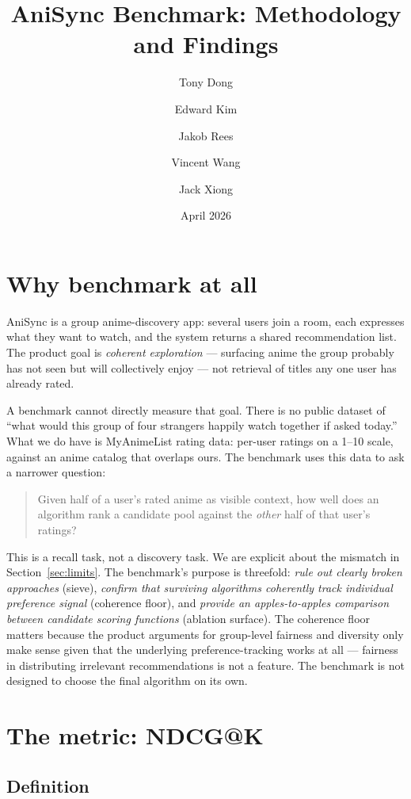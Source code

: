 \documentclass[11pt]{article}
\title{AniSync Benchmark: Methodology and Findings}
\author{Tony Dong \and Edward Kim \and Jakob Rees \and Vincent Wang \and Jack Xiong}
\date{April 2026}
\begin{document}
\maketitle

\section{Why benchmark at all}

AniSync is a group anime-discovery app: several users join a room, each
expresses what they want to watch, and the system returns a shared
recommendation list. The product goal is \emph{coherent exploration} ---
surfacing anime the group probably has not seen but will collectively
enjoy --- not retrieval of titles any one user has already rated.

A benchmark cannot directly measure that goal. There is no public dataset
of ``what would this group of four strangers happily watch together if
asked today.'' What we do have is MyAnimeList rating data: per-user
ratings on a 1--10 scale, against an anime catalog that overlaps ours.
The benchmark uses this data to ask a narrower question:

\begin{quote}
Given half of a user's rated anime as visible context, how well does an
algorithm rank a candidate pool against the \emph{other} half of that
user's ratings?
\end{quote}

This is a recall task, not a discovery task. We are explicit about the
mismatch in Section~\ref{sec:limits}. The benchmark's purpose is
threefold: \emph{rule out clearly broken approaches} (sieve), \emph{confirm
that surviving algorithms coherently track individual preference signal}
(coherence floor), and \emph{provide an apples-to-apples comparison between
candidate scoring functions} (ablation surface). The coherence floor
matters because the product arguments for group-level fairness and
diversity only make sense given that the underlying preference-tracking
works at all --- fairness in distributing irrelevant recommendations
is not a feature. The benchmark is not designed to choose the final
algorithm on its own.

\section{The metric: NDCG@K}

\subsection{Definition}
\end{document}
